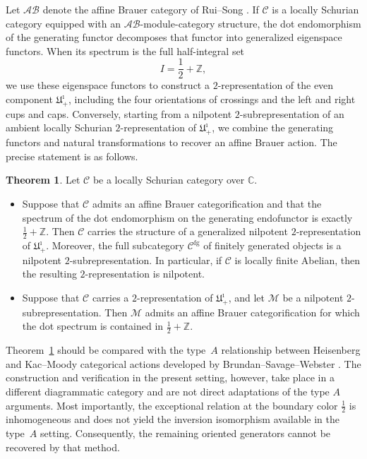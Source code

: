 \documentclass[a4,10pt]{amsart}
\numberwithin{equation}{section}
\theoremstyle{definition}
\newtheorem{THEOREM}{Theorem}
\begin{document}
Let $\mathcal{AB}$  denote the affine Brauer category of Rui–Song \cite{RS-cyc}. If $\mathcal C$ is a locally Schurian category equipped with an $\mathcal{AB}$-module-category structure, the dot endomorphism of the generating functor decomposes that functor into generalized eigenspace functors. When its spectrum is the full half-integral set
\begin{equation} I=\frac 12+\mathbb Z, \end{equation}
we use these eigenspace functors to construct a $2$-representation  of the even component $\mathfrak U^{\imath}_{+}$, including the four orientations of crossings and the left and right cups and caps. 
Conversely, starting from a nilpotent $2$-subrepresentation of an
ambient locally Schurian $2$-representation of
$\mathfrak U^\imath_+$, we combine the generating functors and
natural transformations to recover an affine Brauer action.
 The precise statement is as follows.

\begin{THEOREM}\label{main111}  Let $\mathcal C$ be a locally Schurian category over $\mathbb C$.
\begin{itemize}
\item [(1)]  Suppose that $\mathcal C$ admits an affine Brauer categorification and that the spectrum of the dot endomorphism on the generating endofunctor is exactly $\frac12+\mathbb Z$. Then $\mathcal C$ carries the structure of a generalized nilpotent $2$-representation of $\mathfrak U^{\imath}_{+}$. Moreover, the full subcategory $\mathcal C^{\mathrm{fg}}$ of finitely generated objects is a nilpotent $2$-subrepresentation. In particular, if $\mathcal C$ is locally finite Abelian, then the resulting $2$-representation is nilpotent.
\item[(2)] Suppose that $\mathcal C$ carries a $2$-representation of $\mathfrak U^{\imath}_{+}$, and let $\mathcal M$ be a nilpotent $2$-subrepresentation. Then $\mathcal M$ admits an affine Brauer categorification for which the dot spectrum is contained in $\frac{1}{2}+\mathbb Z$.
\end{itemize}
\end{THEOREM}

Theorem~\ref{main111} should be compared with the type~$A$ relationship between
Heisenberg and Kac--Moody categorical actions developed by
Brundan--Savage--Webster
\cite[Sections~4 and~5.5]{BSW-heisenberg}. 
The construction and verification in the present setting, however, take place in a different diagrammatic 
category and are not direct adaptations of the type $A$ arguments. Most importantly,  the exceptional relation at the boundary
color $\frac12$ is inhomogeneous and does not yield the inversion isomorphism available  in the  type~$A$ setting.  Consequently,  the remaining oriented generators cannot be recovered by that method. 
\end{document}
